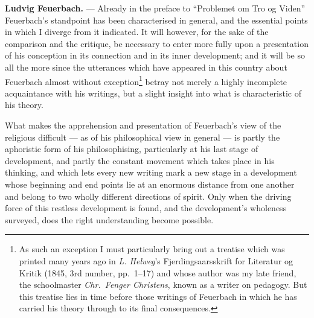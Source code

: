 \documentclass[12pt,a4paper]{book}
\begin{document}
\textbf{Ludvig Feuerbach.} --- Already in the preface to ``Problemet om Tro og
Viden'' Feuerbach's standpoint has been characterised in general, and the
essential points in which I diverge from it indicated. It will however, for
the sake of the comparison and the critique, be necessary to enter more fully
upon a presentation of his conception in its connection and in its inner
development; and it will be so all the more since the utterances which have
appeared in this country about Feuerbach almost without
exception\footnote{As such an exception I must particularly bring out a
treatise which was printed many years ago in \emph{L. Helweg}'s
Fjerdingsaarsskrift for Literatur og Kritik (1845, 3rd number, pp.\ 1--17) and
whose author was my late friend, the schoolmaster \emph{Chr.\ Fenger
Christens}, known as a writer on pedagogy. But this treatise lies in time
before those writings of Feuerbach in which he has carried his theory through
to its final consequences.} betray not merely a highly incomplete acquaintance
with his writings, but a slight insight into what is characteristic of his
theory.

What makes the apprehension and presentation of Feuerbach's view of the
religious difficult --- as of his philosophical view in general --- is partly
the aphoristic form of his philosophising, particularly at his last stage of
development, and partly the constant movement which takes place in his
thinking, and which lets every new writing mark a new stage in a development
whose beginning and end points lie at an enormous distance from one another
and belong to two wholly different directions of spirit. Only when the driving
force of this restless development is found, and the development's wholeness
surveyed, does the right understanding become possible.
\end{document}
